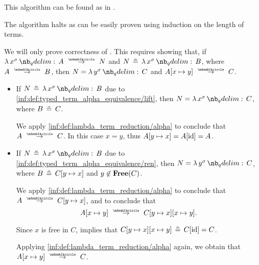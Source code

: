 \begin{comments}
  \item This algorithm can be found as  in \cite{notebook:code}.
\end{comments}
\begin{defproof}
  The algorithm halts as can be easily proven using induction on the length of terms.

  We will only prove correctness of . This requires showing that, if \( \qabs {x^\sigma} A \pred N \) and \( N \aequiv \qabs {x^\sigma} B \), where \( A \pred B \), then \( N = \qabs {y^\sigma} C \) and \( A[x \mapsto y] \pred C \).

  \begin{itemize}
    \item If \( N \aequiv \qabs {x^\sigma} B \) due to \ref{inf:def:typed_term_alpha_equivalence/lift}, then \( N = \qabs {x^\sigma} C \), where \( B \aequiv C \).

    We apply \ref{inf:def:lambda_term_reduction/alpha} to conclude that \( A \pred C \). In this case \( x = y \), thus \( A[y \mapsto x] = A[\operatorname{id}] = A \).

    \item If \( N \aequiv \qabs {x^\sigma} B \) due to \ref{inf:def:typed_term_alpha_equivalence/ren}, then \( N = \qabs {y^\sigma} C \), where \( B \aequiv C[y \mapsto x] \) and \( y \not\in \op*{Free}(C) \).

    We apply \ref{inf:def:lambda_term_reduction/alpha} to conclude that \( A \pred C[y \mapsto x] \), and  to conclude that
    \begin{equation*}
      A[x \mapsto y] \pred C[y \mapsto x][x \mapsto y].
    \end{equation*}

    Since \( x \) is free in \( C \),  implies that \( C[y \mapsto x][x \mapsto y] \aequiv C[\id] = C \).

    Applying \ref{inf:def:lambda_term_reduction/alpha} again, we obtain that \( A[x \mapsto y] \pred C \).
  \end{itemize}
\end{defproof}

